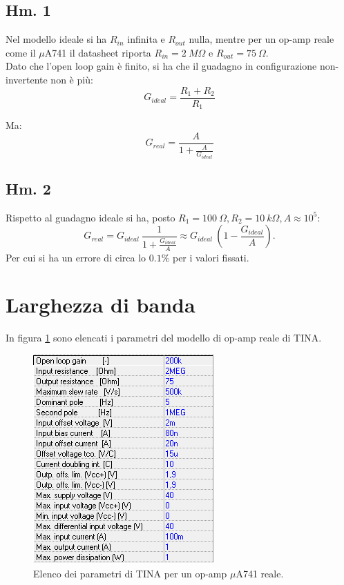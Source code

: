 \documentclass[journal, a4paper]{IEEEtran}
\begin{document}
\subsection{Hm. 1}
Nel modello ideale si ha $R_{in}$ infinita e $R_{out}$ nulla, mentre per un op-amp reale come il $\mu$A741 il datasheet riporta $R_{in} = 2~ M\Omega$ e $R_{out} = 75 ~\Omega$.\\

Dato che l'open loop gain è finito, si ha che il guadagno in configurazione non-invertente non è più:
\begin{equation}
G_{ideal} = \frac{R_1+R_2}{R_1}
\end{equation}

Ma: 
\begin{equation}
G_{real} = \frac{A}{1+\frac{A}{G_{ideal}}}
\end{equation}

\subsection{Hm. 2}
Rispetto al guadagno ideale si ha, posto $R_1 = 100 ~ \Omega, R_2 = 10~k\Omega, A \approx 10^5$:
\begin{equation}
G_{real}=G_{ideal}~\frac{1}{1+\frac{G_{ideal}}{A}} \approx G_{ideal}~(1-\frac{G_{ideal}}{A}).
\end{equation}
Per cui si ha un errore di circa lo $0.1 \%$ per i valori fissati.

\section{Larghezza di banda}

In figura \ref{fig:tina_par} sono elencati i parametri del modello di op-amp reale di TINA.\\

\begin{figure}[htp]
\centering
\includegraphics[scale=0.6]{tina_parameters_opamp}
\caption{Elenco dei parametri di TINA per un op-amp $\mu$A741 reale.}
\label{fig:tina_par}
\end{figure}
\end{document}
